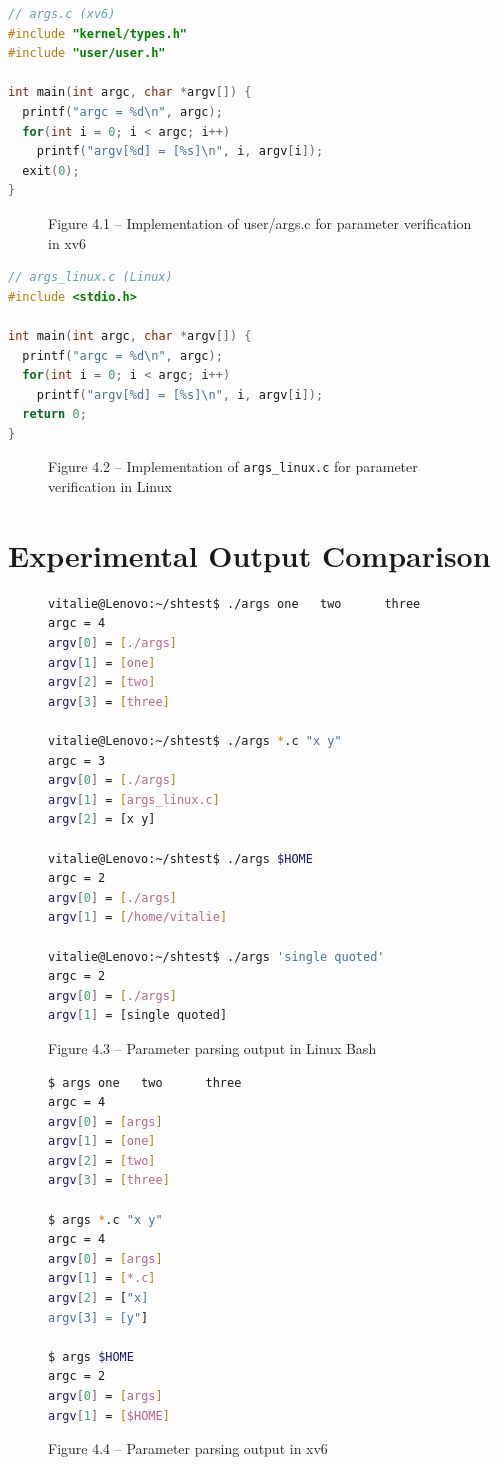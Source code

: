\documentclass[12pt,a4paper]{report}
\numberwithin{equation}{chapter}
\numberwithin{figure}{chapter}
\numberwithin{table}{chapter}
\begin{document}
\begin{lstlisting}[language=c]
// args.c (xv6)
#include "kernel/types.h"
#include "user/user.h"

int main(int argc, char *argv[]) {
  printf("argc = %d\n", argc);
  for(int i = 0; i < argc; i++)
    printf("argv[%d] = [%s]\n", i, argv[i]);
  exit(0);
}
\end{lstlisting}

\begin{figure}[H]
\centering
\caption{Figure 4.1 -- Implementation of user/args.c for parameter verification in xv6}
\end{figure}

\begin{lstlisting}[language=c]
// args_linux.c (Linux)
#include <stdio.h>

int main(int argc, char *argv[]) {
  printf("argc = %d\n", argc);
  for(int i = 0; i < argc; i++)
    printf("argv[%d] = [%s]\n", i, argv[i]);
  return 0;
}
\end{lstlisting}

\begin{figure}[H]
\centering
\caption{Figure 4.2 -- Implementation of \texttt{args\_linux.c} for parameter verification in Linux}
\end{figure}

\section{Experimental Output Comparison}

\begin{figure}[H]
\centering
\begin{lstlisting}[language=bash]
vitalie@Lenovo:~/shtest$ ./args one   two      three
argc = 4
argv[0] = [./args]
argv[1] = [one]
argv[2] = [two]
argv[3] = [three]

vitalie@Lenovo:~/shtest$ ./args *.c "x y"
argc = 3
argv[0] = [./args]
argv[1] = [args_linux.c]
argv[2] = [x y]

vitalie@Lenovo:~/shtest$ ./args $HOME
argc = 2
argv[0] = [./args]
argv[1] = [/home/vitalie]

vitalie@Lenovo:~/shtest$ ./args 'single quoted'
argc = 2
argv[0] = [./args]
argv[1] = [single quoted]
\end{lstlisting}
\caption{Figure 4.3 -- Parameter parsing output in Linux Bash}
\end{figure}

\begin{figure}[H]
\centering
\begin{lstlisting}[language=bash]
$ args one   two      three
argc = 4
argv[0] = [args]
argv[1] = [one]
argv[2] = [two]
argv[3] = [three]

$ args *.c "x y"
argc = 4
argv[0] = [args]
argv[1] = [*.c]
argv[2] = ["x]
argv[3] = [y"]

$ args $HOME
argc = 2
argv[0] = [args]
argv[1] = [$HOME]
\end{lstlisting}
\caption{Figure 4.4 -- Parameter parsing output in xv6}
\end{figure}
\end{document}
